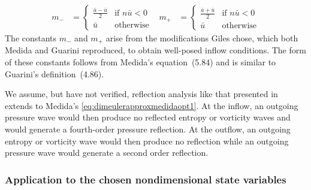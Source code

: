 \documentclass[letterpaper,11pt,nointlimits,reqno,draft]{amsbook}
\begin{document}
\begin{align}
    m_{-} &= \begin{cases} \frac{\bar{a}-\bar{u}}{2} &\text{if $n\bar{u}<0$} \\ \bar{u} &\text{otherwise} \end{cases}
&
    m_{+} &= \begin{cases} \frac{\bar{a}+\bar{u}}{2} &\text{if $n\bar{u}<0$} \\ \bar{u} &\text{otherwise} \end{cases}
\end{align}
The constants $m_{-}$ and $m_{+}$ arise from the modifications Giles chose,
which both Medida and Guarini reproduced, to obtain well-posed inflow
conditions.  The form of these constants follows from Medida's equation~(5.84)
and is similar to Guarini's definition~(4.86).

We assume, but have not verified, reflection analysis like that presented in
\citet[\textsection{}3.7.4]{Giles1988Nonreflecting} extends to Medida's
\eqref{eq:dimeulerapproxmedidaopt1}.  At the inflow, an outgoing pressure wave
would then produce no reflected entropy or vorticity waves and would generate a
fourth-order pressure reflection.  At the outflow, an outgoing entropy or
vorticity wave would then produce no reflection while an outgoing pressure wave
would generate a second order reflection.

\subsubsection{Application to the chosen nondimensional state variables}
\end{document}
